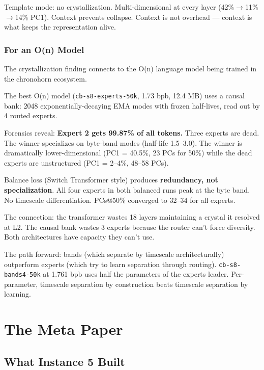 \documentclass[11pt,a4paper]{report}
\begin{document}
Template mode: no crystallization. Multi-dimensional at every layer (42\%$\to$11\%$\to$14\% PC1). Context prevents collapse. Context is not overhead --- context is what keeps the representation alive.

\section{For an O(n) Model}

The crystallization finding connects to the O(n) language model being trained in the chronohorn ecosystem.

The best O(n) model (\texttt{cb-s8-experts-50k}, 1.73 bpb, 12.4 MB) uses a causal bank: 2048 exponentially-decaying EMA modes with frozen half-lives, read out by 4 routed experts.

Forensics reveal: \textbf{Expert 2 gets 99.87\% of all tokens.} Three experts are dead. The winner specializes on byte-band modes (half-life 1.5--3.0). The winner is dramatically lower-dimensional (PC1 = 40.5\%, 23 PCs for 50\%) while the dead experts are unstructured (PC1 = 2--4\%, 48--58 PCs).

Balance loss (Switch Transformer style) produces \textbf{redundancy, not specialization}. All four experts in both balanced runs peak at the byte band. No timescale differentiation. PCs@50\% converged to 32--34 for all experts.

The connection: the transformer wastes 18 layers maintaining a crystal it resolved at L2. The causal bank wastes 3 experts because the router can't force diversity. Both architectures have capacity they can't use.

The path forward: bands (which separate by timescale architecturally) outperform experts (which try to learn separation through routing). \texttt{cb-s8-bands4-50k} at 1.761 bpb uses half the parameters of the experts leader. Per-parameter, timescale separation by construction beats timescale separation by learning.

\part{The Meta Paper}

\chapter{What Instance 5 Built}
\end{document}
